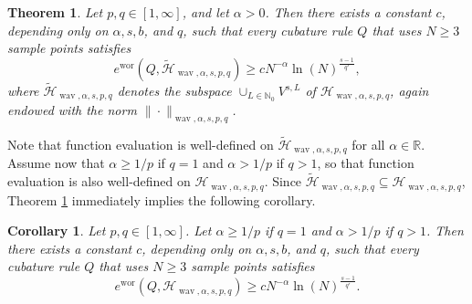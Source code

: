 \documentclass[12pt]{article}
\DeclareMathOperator{\wav}{wav}
\DeclareMathOperator{\wor}{wor}
\newtheorem{theorem}{Theorem}
\newtheorem{corollary}{Corollary}
\newcommand{\RR}{\mathbb{R}}
\newcommand{\HH}{\mathcal{H}}
\newcommand{\N}{\mathbb{N}}
\begin{document}
\begin{theorem}
 \label{LowerBound}
Let $p,q \in [1, \infty]$, and let  $\alpha >0$.
Then there exists a constant $c$,
depending only on $\alpha, s,b$, and $q$, such that every cubature  rule
 $Q$ that uses $N\ge 3$ sample points satisfies
\begin{equation*}
 e^{\wor}(Q, \widetilde{\HH}_{\wav, \alpha, s,p,q}) \ge c N^{-\alpha}
\ln(N)^{\frac{s-1}{q'}},
\end{equation*}
where $\widetilde{\HH}_{\wav, \alpha, s,p,q}$ denotes the subspace $\cup_{L\in \N_0} V^{s,L}$ of $\HH_{\wav, \alpha, s,p,q}$, again endowed with the norm ${\|\cdot\|_{\wav, \alpha, s,p,q}}$.
\end{theorem}

Note that function evaluation is well-defined on $\widetilde{\HH}_{\wav, \alpha, s,p,q}$ for all $\alpha \in \RR$. Assume now that $\alpha \ge 1/p$ if $q=1$ and $\alpha > 1/p$ if $q>1$, so that function evaluation is also well-defined on $\HH_{\wav, \alpha, s,p,q}$.
Since $\widetilde{\HH}_{\wav, \alpha, s,p,q} \subseteq \HH_{\wav, \alpha, s,p,q}$, Theorem \ref{LowerBound} immediately implies the following corollary.

\begin{corollary}
 \label{Cor_LowerBound}
Let $p,q \in [1, \infty]$. Let  $\alpha \ge 1/p$ if $q=1$ and $\alpha > 1/p$ if $q>1$.
Then there exists a constant $c$,
depending only on $\alpha, s,b$, and $q$, such that every cubature  rule
 $Q$ that uses $N\ge 3$ sample points satisfies
\begin{equation*}
 e^{\wor}(Q, \HH_{\wav, \alpha, s,p,q}) \ge c N^{-\alpha}
\ln(N)^{\frac{s-1}{q'}}.
\end{equation*}
\end{corollary}
\end{document}
